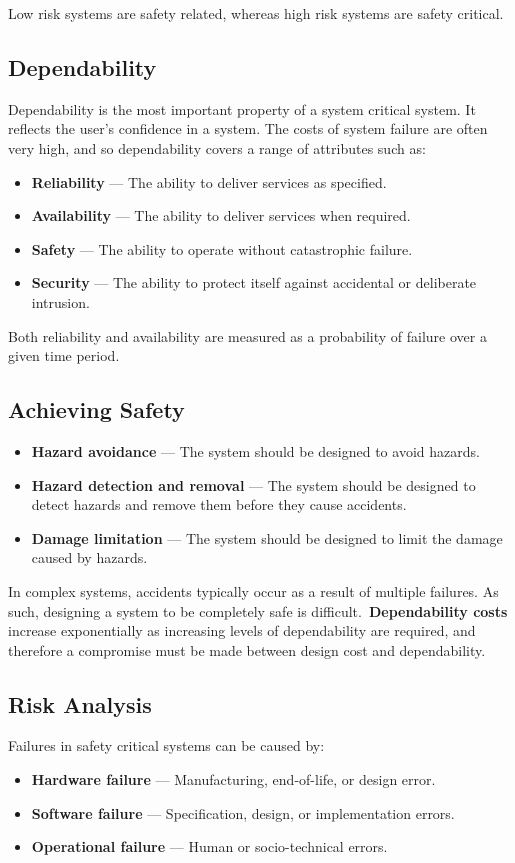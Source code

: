 \documentclass{article}
\begin{document}
Low risk systems are safety related, whereas high risk systems are
safety critical.
\subsection{Dependability}
Dependability is the most important property of a system critical
system. It reflects the user's confidence in a system. The costs of
system failure are often very high, and so dependability covers a range
of attributes such as:
\begin{itemize}
    \item \textbf{Reliability} --- The ability to deliver services as
          specified.
    \item \textbf{Availability} --- The ability to deliver services
          when required.
    \item \textbf{Safety} --- The ability to operate without
          catastrophic failure.
    \item \textbf{Security} --- The ability to protect itself against
          accidental or deliberate intrusion.
\end{itemize}
Both reliability and availability are measured as a probability of
failure over a given time period.
\subsection{Achieving Safety}
\begin{itemize}
    \item \textbf{Hazard avoidance} --- The system should be designed
          to avoid hazards.
    \item \textbf{Hazard detection and removal} --- The system
          should be designed to detect hazards and remove them
          before they cause accidents.
    \item \textbf{Damage limitation} --- The system should be designed
          to limit the damage caused by hazards.
\end{itemize}
In complex systems, accidents typically occur as a result of multiple
failures. As such, designing a system to be completely safe is
difficult.\ \textbf{Dependability costs} increase exponentially as
increasing levels of dependability are required, and therefore a
compromise must be made between design cost and dependability.
\subsection{Risk Analysis}
Failures in safety critical systems can be caused by:
\begin{itemize}
    \item \textbf{Hardware failure} --- Manufacturing, end-of-life,
          or design error.
    \item \textbf{Software failure} --- Specification, design,
          or implementation errors.
    \item \textbf{Operational failure} --- Human or socio-technical
          errors.
\end{itemize}
\end{document}
